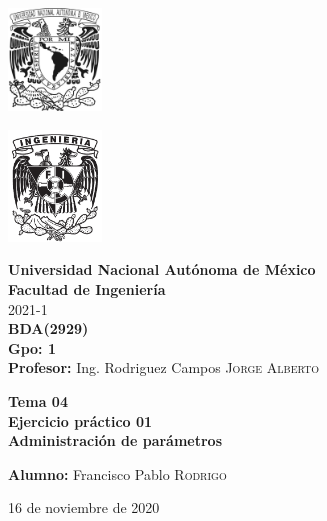 \documentclass{article}
\newcommand{\materia}{BDA}
\newcommand{\clave}{2929}
\newcommand{\profesor}{Ing. Rodriguez Campos \textsc{Jorge Alberto}}
\newcommand{\semestre}{2021-1}
\newcommand{\alumno}{Francisco Pablo \textsc{Rodrigo}}
\newcommand{\actividad}{Tema 04 \\ Ejercicio práctico 01}
\newcommand{\titulo}{Administración de parámetros}
\newcommand{\fechaEntrega}{16 de noviembre de 2020}
\begin{document}
\thispagestyle{empty}
\begin{minipage}[t][5cm][t]{0.2\linewidth}
    \includegraphics[width=2.5cm]{unam.jpg}
    \vspace{10cm}

    \includegraphics[width=2.5cm]{fiblack}
\end{minipage}
\begin{minipage}[t]{0.7\linewidth}
    \vspace{-2.5cm}
    \LARGE{\textbf{Universidad Nacional Autónoma de México}}\\
    \Large{\textbf{Facultad de Ingeniería}} \\

    \large{\semestre}\\[2cm]

    \large{\textbf{\materia (\clave)}}\\
    \large{\textbf{Gpo: 1}}\\[5mm]
    \large{\textbf{Profesor:} \profesor}\\ [1.5cm]
    \begin{center}
        \LARGE{\textbf{\actividad}}\\
        \LARGE{\textbf{\titulo}}\\
    \end{center}

    \vspace{3.3cm}

    \large{\textbf{Alumno:} \alumno} \\[1.5cm]

    \begin{flushright}
        \fechaEntrega%
    \end{flushright}
\end{minipage}

\newpage
\end{document}
